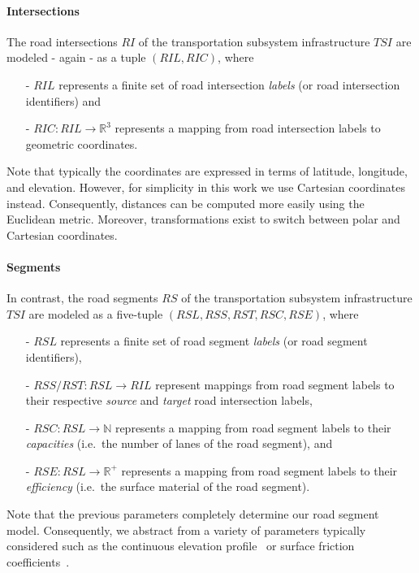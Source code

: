 \paragraph{Intersections}
\label{intersections}

The road intersections $RI$ of the transportation subsystem infrastructure $TSI$ are modeled - again - as a tuple $(RIL, RIC)$, where
\begin{itemize}
	\item[-] $RIL$ represents a finite set of road intersection \textit{labels} (or road intersection identifiers) and
	\item[-] $RIC: RIL \rightarrow \mathbb{R}^3$ represents a mapping from road intersection labels to geometric coordinates.
\end{itemize}
Note that typically the coordinates are expressed in terms of latitude, longitude, and elevation. However, for simplicity in this work we use Cartesian coordinates instead. Consequently, distances can be computed more easily using the Euclidean metric. Moreover, transformations exist to switch between polar and Cartesian coordinates.

\paragraph{Segments}
\label{segments}

In contrast, the road segments $RS$ of the transportation subsystem infrastructure $TSI$ are modeled as a five-tuple $(RSL, RSS, RST, RSC, RSE)$, where
\begin{itemize}
	\item[-] $RSL$ represents a finite set of road segment \textit{labels} (or road segment identifiers),
	\item[-] $RSS/RST: RSL \rightarrow RIL$ represent mappings from road segment labels to their respective \textit{source} and \textit{target} road intersection labels,
	\item[-] $RSC: RSL \rightarrow \mathbb{N}$ represents a mapping from road segment labels to their \textit{capacities} (i.e.\ the number of lanes of the road segment), and
	\item[-] $RSE: RSL \rightarrow \mathbb{R}^+$ represents a mapping from road segment labels to their \textit{efficiency} (i.e.\ the surface material of the road segment).
\end{itemize}
Note that the previous parameters completely determine our road segment model. Consequently, we abstract from a variety of parameters typically considered such as the continuous elevation profile~\cite{?} or surface friction coefficients~\cite{?}.

